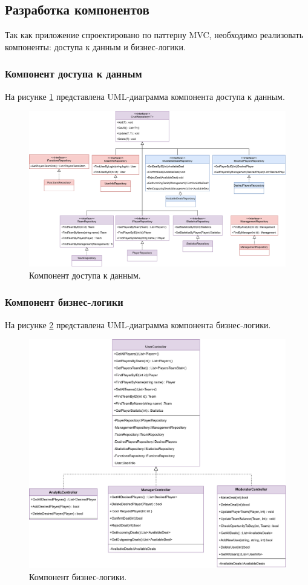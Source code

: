 \subsection{Разработка компонентов}
Так как приложение спроектировано по паттерну MVC, необходимо реализовать компоненты: доступа к данным и бизнес-логики.

\subsubsection{Компонент доступа к данным}
На рисунке \ref{img:AccessToDB} представлена UML-диаграмма компонента доступа к данным.
\begin{figure}[h!]
	\centering
	\includegraphics[scale=0.14]{img/AccessToDB.png}
	\caption{Компонент доступа к данным.}
	\label{img:AccessToDB}
\end{figure}
\newpage
\subsubsection{Компонент бизнес-логики}
На рисунке \ref{img:Controllers} представлена UML-диаграмма компонента бизнес-логики.
\begin{figure}[h!]
	\centering
	\includegraphics[scale=0.14]{img/Controllers.png}
	\caption{Компонент бизнес-логики.}
	\label{img:Controllers}
\end{figure}
